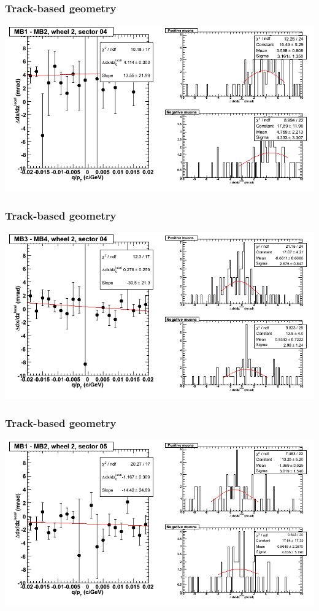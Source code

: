\documentclass[compress]{beamer}
\begin{document}
\begin{frame}
\frametitle{Track-based geometry}
\includegraphics[width=\linewidth]{NOV4_segdiffs/dt13_slope_E_04_12.png}
\end{frame}

\begin{frame}
\frametitle{Track-based geometry}
\includegraphics[width=\linewidth]{NOV4_segdiffs/dt13_slope_E_04_34.png}
\end{frame}

\begin{frame}
\frametitle{Track-based geometry}
\includegraphics[width=\linewidth]{NOV4_segdiffs/dt13_slope_E_05_12.png}
\end{frame}
\end{document}
